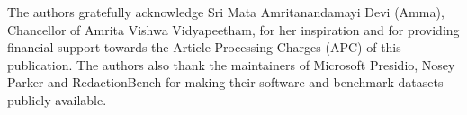 The authors gratefully acknowledge Sri Mata Amritanandamayi Devi (Amma), Chancellor of Amrita Vishwa Vidyapeetham, for her inspiration and for providing financial support towards the Article Processing Charges (APC) of this publication. The authors also thank the maintainers of Microsoft Presidio, Nosey Parker and RedactionBench for making their software and benchmark datasets publicly available.
